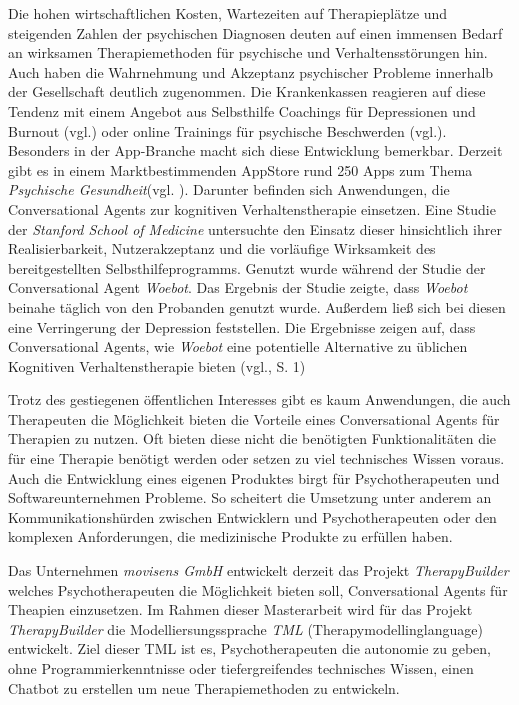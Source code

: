 Die hohen wirtschaftlichen Kosten, Wartezeiten auf Therapieplätze und steigenden Zahlen der psychischen Diagnosen deuten auf einen immensen Bedarf an wirksamen Therapiemethoden für psychische und Verhaltensstörungen hin. Auch haben die Wahrnehmung und Akzeptanz psychischer Probleme innerhalb der Gesellschaft deutlich zugenommen. Die Krankenkassen reagieren auf diese Tendenz mit einem Angebot aus Selbsthilfe Coachings für Depressionen und Burnout (vgl.\cite{Hilfebei71:online}\cite{TKDepres18:online}) oder online Trainings für psychische Beschwerden (vgl.\cite{PROMIND78:online}). Besonders in der App-Branche macht sich diese Entwicklung bemerkbar. Derzeit gibt es in einem Marktbestimmenden AppStore rund 250 Apps zum Thema \emph{Psychische Gesundheit}(vgl. \cite{psychisc90:online}). Darunter befinden sich Anwendungen, die Conversational Agents zur kognitiven Verhaltenstherapie einsetzen. Eine Studie der \emph{Stanford School of Medicine} untersuchte den Einsatz dieser hinsichtlich ihrer Realisierbarkeit, Nutzerakzeptanz und die vorläufige Wirksamkeit des bereitgestellten Selbsthilfeprogramms. Genutzt wurde während der Studie der Conversational Agent \emph{Woebot}. Das Ergebnis der Studie zeigte, dass \emph{Woebot} beinahe täglich von den Probanden genutzt wurde. Außerdem ließ sich bei diesen eine Verringerung der Depression feststellen. Die Ergebnisse zeigen auf, dass Conversational Agents, wie \emph{Woebot} eine potentielle Alternative zu üblichen Kognitiven Verhaltenstherapie bieten (vgl.\cite{Hany1997}, S. 1) 

Trotz des gestiegenen öffentlichen Interesses  gibt es kaum Anwendungen, die auch Therapeuten die Möglichkeit bieten die Vorteile eines Conversational Agents für Therapien zu nutzen. Oft bieten diese nicht die benötigten Funktionalitäten die für eine Therapie benötigt werden oder setzen zu viel technisches Wissen voraus. Auch die Entwicklung eines eigenen Produktes birgt für Psychotherapeuten und Softwareunternehmen Probleme. So scheitert die Umsetzung unter anderem an Kommunikationshürden zwischen Entwicklern und Psychotherapeuten oder den komplexen Anforderungen, die medizinische Produkte zu erfüllen haben. 

Das Unternehmen \emph{movisens GmbH} entwickelt derzeit das Projekt \emph{TherapyBuilder} welches Psychotherapeuten die Möglichkeit bieten soll, Conversational Agents für Theapien einzusetzen. Im Rahmen dieser Masterarbeit wird für das Projekt \emph{TherapyBuilder} die Modelliersungssprache \emph{TML} (Therapymodellinglanguage) entwickelt. Ziel dieser TML ist es, Psychotherapeuten die autonomie zu geben, ohne Programmierkenntnisse oder tiefergreifendes technisches Wissen, einen Chatbot zu erstellen um neue Therapiemethoden zu entwickeln.



